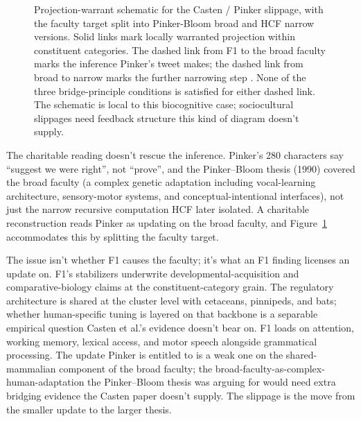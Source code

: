 \documentclass[12pt]{article}
\begin{document}
\begin{figure}[H]
\caption[Projection-warrant schematic for the Casten / Pinker slippage]{Projection-warrant schematic for the Casten / Pinker slippage, with the faculty target split into Pinker-Bloom broad and HCF narrow versions. Solid links mark locally warranted projection within constituent categories. The dashed link from F1 to the broad faculty marks the inference Pinker's tweet makes; the dashed link from broad to narrow marks the further narrowing step \citep{hauser2002}. None of the three bridge-principle conditions is satisfied for either dashed link. The schematic is local to this biocognitive case; sociocultural slippages need feedback structure this kind of diagram doesn't supply.}
\label{fig:slippage}
\end{figure}

The charitable reading doesn't rescue the inference. Pinker's 280 characters say \enquote{suggest we were right}, not \enquote{prove}, and the Pinker--Bloom thesis (1990) covered the broad faculty (a complex genetic adaptation including vocal-learning architecture, sensory-motor systems, and conceptual-intentional interfaces), not just the narrow recursive computation HCF later isolated. A charitable reconstruction reads Pinker as updating on the broad faculty, and Figure~\ref{fig:slippage} accommodates this by splitting the faculty target.

The issue isn't whether F1 causes the faculty; it's what an F1 finding licenses an update on. F1's stabilizers underwrite developmental-acquisition and comparative-biology claims at the constituent-category grain. The regulatory architecture is shared at the cluster level with cetaceans, pinnipeds, and bats; whether human-specific tuning is layered on that backbone is a separable empirical question Casten et al.'s evidence doesn't bear on. F1 loads on attention, working memory, lexical access, and motor speech alongside grammatical processing. The update Pinker is entitled to is a weak one on the shared-mammalian component of the broad faculty; the broad-faculty-as-complex-human-adaptation the Pinker--Bloom thesis was arguing for would need extra bridging evidence the Casten paper doesn't supply. The slippage is the move from the smaller update to the larger thesis.
\end{document}
